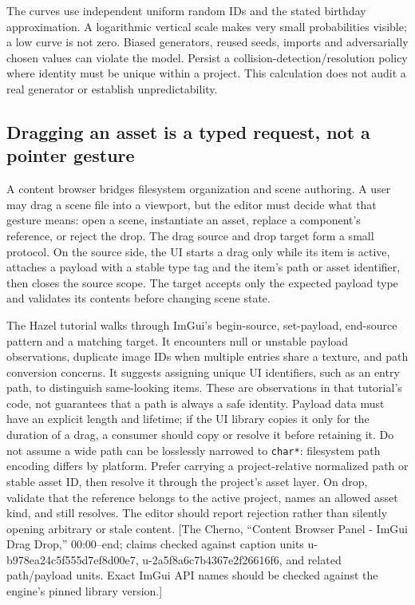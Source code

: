 The curves use independent uniform random IDs and the stated birthday approximation. A logarithmic vertical scale makes very small probabilities visible; a low curve is not zero. Biased generators, reused seeds, imports and adversarially chosen values can violate the model. Persist a collision-detection/resolution policy where identity must be unique within a project. This calculation does not audit a real generator or establish unpredictability.

\subsection{Dragging an asset is a typed request, not a pointer gesture}\label{dragging-an-asset-is-a-typed-request-not-a-pointer-gesture}

A content browser bridges filesystem organization and scene authoring. A user may drag a scene file into a viewport, but the editor must decide what that gesture means: open a scene, instantiate an asset, replace a component's reference, or reject the drop. The drag source and drop target form a small protocol. On the source side, the UI starts a drag only while its item is active, attaches a payload with a stable type tag and the item's path or asset identifier, then closes the source scope. The target accepts only the expected payload type and validates its contents before changing scene state.

The Hazel tutorial walks through ImGui's begin-source, set-payload, end-source pattern and a matching target. It encounters null or unstable payload observations, duplicate image IDs when multiple entries share a texture, and path conversion concerns. It suggests assigning unique UI identifiers, such as an entry path, to distinguish same-looking items. These are observations in that tutorial's code, not guarantees that a path is always a safe identity. Payload data must have an explicit length and lifetime; if the UI library copies it only for the duration of a drag, a consumer should copy or resolve it before retaining it. Do not assume a wide path can be losslessly narrowed to \texttt{char*}: filesystem path encoding differs by platform. Prefer carrying a project-relative normalized path or stable asset ID, then resolve it through the project's asset layer. On drop, validate that the reference belongs to the active project, names an allowed asset kind, and still resolves. The editor should report rejection rather than silently opening arbitrary or stale content. {[}The Cherno, ``Content Browser Panel - ImGui Drag Drop,'' 00:00--end; claims checked against caption units u-b978ea24c5f555d7ef8d00e7, u-2a5f8a6c7b4367e2f26616f6, and related path/payload units. Exact ImGui API names should be checked against the engine's pinned library version.{]}

